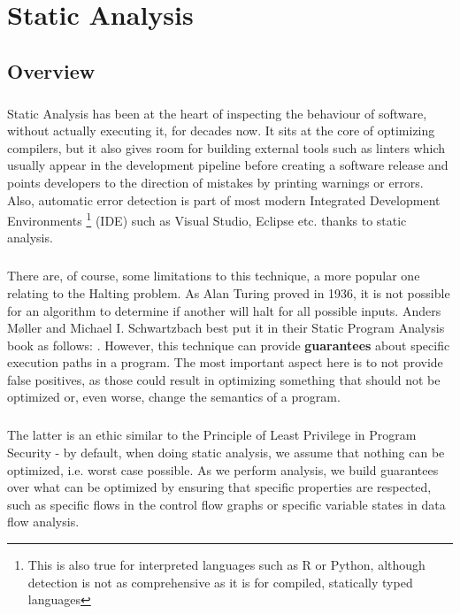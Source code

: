 \chapter{Static Analysis}

\section*{Overview}
\paragraph*{}
Static Analysis has been at the heart of inspecting the behaviour of software, without actually executing it, for decades now. It sits at the core of optimizing compilers, but it also gives room for building external tools such as linters which usually appear in the development pipeline before creating a software release and points developers to the direction of mistakes by printing warnings or errors. Also, automatic error detection is part of most modern Integrated Development Environments \footnote{This is also true for interpreted languages such as R or Python, although detection is not as comprehensive as it is for compiled, statically typed languages} (IDE) such as Visual Studio, Eclipse etc. thanks to static analysis.

\paragraph*{}
There are, of course, some limitations to this technique, a more popular one relating to the Halting problem. As Alan Turing proved in 1936, it is not possible for an algorithm to determine if another will halt for all possible inputs. Anders Møller and Michael I. Schwartzbach best put it in their Static Program Analysis book as follows: \cite[automated reasoning of software generally must involve approximation]{static-program-analysis}. However, this technique can provide \textbf{guarantees} about specific execution paths in a program. The most important aspect here is to not provide false positives, as those could result in optimizing something that should not be optimized or, even worse, change the semantics of a program.

\paragraph*{}
The latter is an ethic similar to the Principle of Least Privilege in Program Security - by default, when doing static analysis, we assume that nothing can be optimized, i.e. worst case possible. As we perform analysis, we build guarantees over what can be optimized by ensuring that specific properties are respected, such as specific flows in the control flow graphs or specific variable states in data flow analysis.

